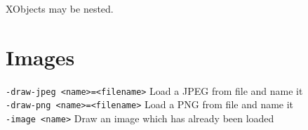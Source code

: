 \documentclass{book}
\begin{document}
\bigskip
\ifdefined\HCode
{}
\else
{}
\fi
\bigskip

\noindent XObjects may be nested.

\section{Images}
  {\small\begin{framed}
   \noindent\verb!-draw-jpeg <name>=<filename>! Load a JPEG from file and name it\\
   \noindent\verb!-draw-png <name>=<filename>! Load a PNG from file and name it\\
   \noindent\verb!-image <name>! Draw an image which has already been loaded
  \end{framed}}
\end{document}
